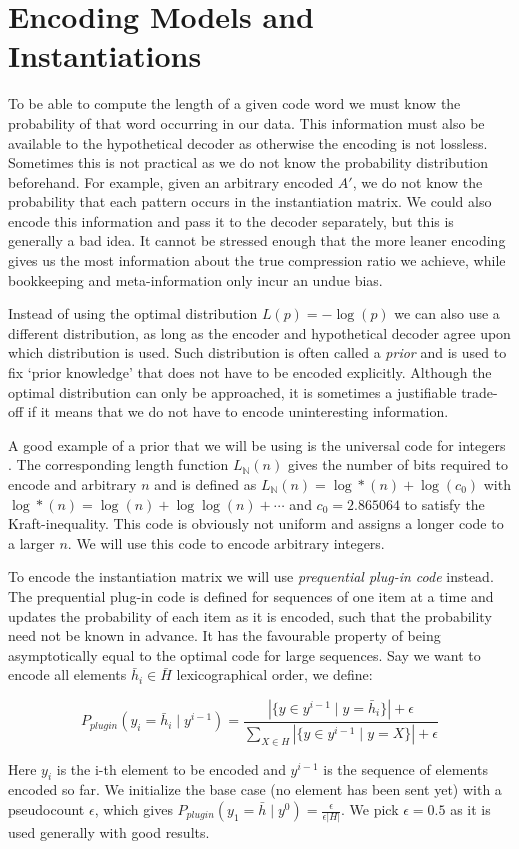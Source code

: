 \documentclass[a4paper,notoc,oneside]{tufte-book}
\begin{document}
\section{Encoding Models and Instantiations}
To be able to compute the length of a given code word we must know the probability of that word occurring in our data. This information must also be available to the hypothetical decoder as otherwise the encoding is not lossless. Sometimes this is not practical as we do not know the probability distribution beforehand. For example, given an arbitrary encoded $A'$, we do not know the probability that each pattern occurs in the instantiation matrix. We could also encode this information and pass it to the decoder separately, but this is generally a bad idea. It cannot be stressed enough that the more leaner encoding gives us the most information about the true compression ratio we achieve, while bookkeeping and meta-information only incur an undue bias. 

Instead of using the optimal distribution $L(p)=-\log(p)$ we can also use a different distribution, as long as the encoder and hypothetical decoder agree upon which distribution is used. Such distribution is often called a \emph{prior} and is used to fix `prior knowledge' that does not have to be encoded explicitly. Although the optimal distribution can only be approached, it is sometimes a justifiable trade-off if it means that we do not have to encode uninteresting information.  

A good example of a prior that we will be using is the universal code for integers \cite{integerprior}. The corresponding length function $L_{\mathbb{N}}(n)$ gives the number of bits required to encode and arbitrary $n$ and is defined as $L_{\mathbb{N}}(n) = \log*(n) + \log(c_0)$ with $\log*(n) = \log(n) + \log \log(n) + \cdots$ and $c_0=2.865064$ to satisfy the Kraft-inequality. This code is obviously not uniform and assigns a longer code to a larger $n$. We will use this code to encode arbitrary integers.

To encode the instantiation matrix we will use \emph{prequential plug-in code} \cite{ppcode} instead. The prequential plug-in code is defined for sequences of one item at a time and updates the probability of each item as it is encoded, such that the probability need not be known in advance. It has the favourable property of being asymptotically equal to the optimal code for large sequences. Say we want to encode all elements $\bar{h}_i \in \bar{H}$ lexicographical order, we define:
\begin{definition}\label{plugin}
$$
P_{plugin}( y_i = \bar{h}_i \mid y^{i-1} ) = \frac{|\{y \in y^{i-1} \mid y = \bar{h}_i\}| + \epsilon }{\sum_{X \in H}|\{y \in y^{i-1} \mid y = X\}| + \epsilon}
$$
\end{definition}
Here $y_i$ is the i-th element to be encoded and $y^{i-1}$ is the sequence of elements encoded so far. We initialize the base case (no element has been sent yet) with a pseudocount $\epsilon$, which gives $P_{plugin}( y_1 = \bar{h} \mid y^{0} ) = \frac{\epsilon}{\epsilon|H|}$. We pick $\epsilon=0.5$ as it is used generally with good results.
\end{document}
